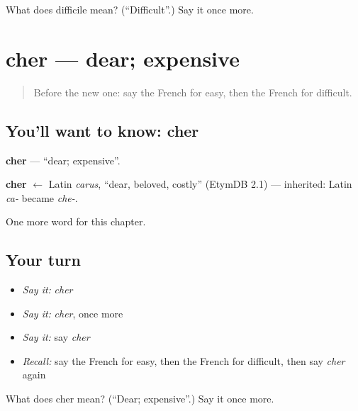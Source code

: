 \begin{tcolorbox}[breakable,colback=teal!4,colframe=teal!35!black,title={Before you move on}]
What does difficile mean? (\textquotedblleft{}Difficult\textquotedblright{}.) Say it once more.
\end{tcolorbox}
\section[cher]{cher — dear; expensive}

\label{lesson:FR-C90-cher}



\begin{quote}
Before the new one: say the French for easy, then the French for difficult.
\end{quote}

\subsection*{You'll want to know: cher}
\textbf{cher} — \textquotedblleft{}dear; expensive\textquotedblright{}.

\begin{cousinweb}
\textbf{cher} $\leftarrow$ Latin \emph{carus}, \textquotedblleft{}dear, beloved, costly\textquotedblright{} (EtymDB 2.1) — inherited: Latin \emph{ca-} became \emph{che-}.
\end{cousinweb}

\begin{grammarlens}[title={What you've built}]
One more word for this chapter.
\end{grammarlens}

\subsection*{Your turn}
\begin{itemize}
\raggedright
  \item \emph{Say it:} \emph{cher}
  \item \emph{Say it:} \emph{cher}, once more
  \item \emph{Say it:} say \emph{cher}
  \item \emph{Recall:} say the French for easy, then the French for difficult, then say \emph{cher} again
\end{itemize}

\begin{tcolorbox}[breakable,colback=teal!4,colframe=teal!35!black,title={Before you move on}]
What does cher mean? (\textquotedblleft{}Dear; expensive\textquotedblright{}.) Say it once more.
\end{tcolorbox}
